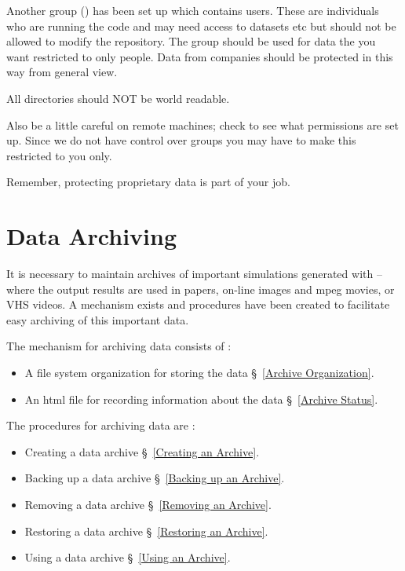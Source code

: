 Another group () has been set up which contains \parflow{}
users.  These are individuals who are running the code and may need
access to datasets etc but should not be allowed to modify the
repository.  The group  should be used for data the you want
restricted to only \parflow{} people.  Data from companies should be
protected in this way from general view.

All \parflow{} directories should NOT be world readable.

Also be a little careful on remote machines; check to see what
permissions are set up.  Since we do not have control over groups you
may have to make this restricted to you only.  

Remember, protecting proprietary data is part of your job.


\section{Data Archiving}
\label{Data Archiving}

It is necessary to maintain archives of important simulations
generated with \parflow{} -- where the output results are used in
papers, on-line images and mpeg movies, or VHS videos.  A mechanism
exists and procedures have been created to facilitate easy archiving
of this important data.

The mechanism for archiving data consists of :
\begin{itemize}
\item A file system organization for storing the data \S~\ref{Archive Organization}.
\item An html file for recording information about the data \S~\ref{Archive Status}.
\end{itemize}

The procedures for archiving data are :
\begin{itemize}
\item Creating a data archive \S~\ref{Creating an Archive}.
\item Backing up a data archive \S~\ref{Backing up an Archive}.
\item Removing a data archive \S~\ref{Removing an Archive}.
\item Restoring a data archive \S~\ref{Restoring an Archive}.
\item Using a data archive \S~\ref{Using an Archive}.
\end{itemize}


